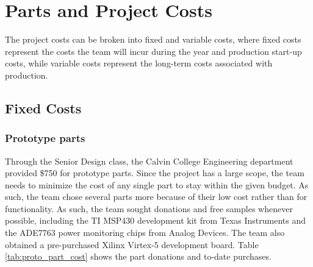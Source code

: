 \section{Parts and Project Costs}
\label{sec:parts_and_costs}

The project costs can be broken into fixed and variable costs, where fixed costs represent the costs the team will incur during the year and production start-up costs, while variable costs represent the long-term costs associated with production.

\subsection{Fixed Costs}
\subsubsection{Prototype parts}
Through the Senior Design class, the Calvin College Engineering department provided \$750 for prototype parts. Since the project has a large scope, the team needs to minimize the cost of any single part to stay within the given budget. As such, the team chose several parts more because of their low cost rather than for functionality. As such, the team sought donations and free samples whenever possible, including the TI MSP430 development kit from Texas Instruments and the ADE7763 power monitoring chips from Analog Devices. The team also obtained a pre-purchased Xilinx Virtex-5 development board. Table \ref{tab:proto_part_cost} shows the part donations and to-date purchases. 

